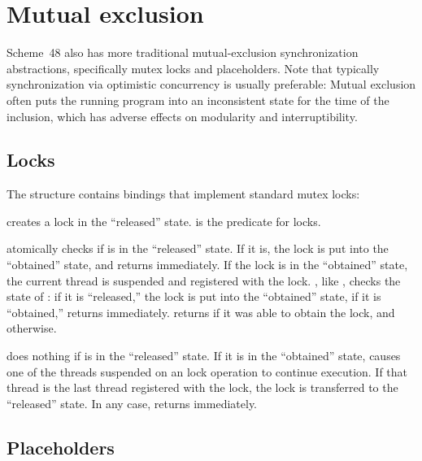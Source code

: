 \section{Mutual exclusion}

Scheme~48 also has more traditional mutual-exclusion synchronization
abstractions, specifically mutex locks and placeholders.  Note that
typically synchronization via optimistic concurrency is usually
preferable: Mutual exclusion often puts the running program into an
inconsistent state for the time of the inclusion, which has adverse
effects on modularity and interruptibility.

\subsection{Locks}

The  structure contains bindings that implement standard
mutex locks:
%
\begin{protos}
\end{protos}
%
 creates a lock in the ``released'' state.
 is the predicate for locks.

 atomically checks if  is in the
``released'' state.  If it is, the lock is put into the ``obtained''
state, and  returns immediately.  If the lock is in
the ``obtained'' state, the current thread is suspended and registered
with the lock.
, like , checks the state of
: if it is ``released,'' the lock is put into the
``obtained'' state, if it is ``obtained,'' 
returns immediately.   returns  if
it was able to obtain the lock, and  otherwise.

 does nothing if  is in the ``released''
state.  If it is in the ``obtained'' state, 
causes one of the threads suspended on an  lock
operation to continue execution.  If that thread is the last thread
registered with the lock, the lock is transferred to the ``released''
state.  In any case,  returns immediately.

\subsection{Placeholders}

